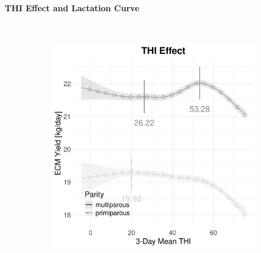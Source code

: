 \paragraph{THI Effect and Lactation Curve} \quad \\
\begin{figure}[H]
    \centering
    \begin{subfigure}[b]{0.45\textwidth}
        \centering
        \includegraphics[width=\textwidth]{thesis/figures/models/ecm/before2010/si_ecm_before2010/si_ecm_before2010_marginal_thi_milk_combined.png}
    \end{subfigure}
    \hspace{0.05\textwidth} %
    \begin{subfigure}[b]{0.45\textwidth}
        \centering

\end{subfigure}
\end{figure}
